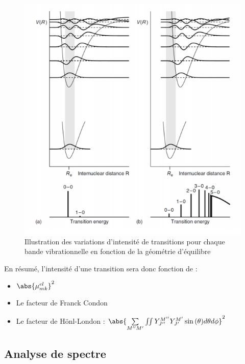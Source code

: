 \begin{figure}
    \centering
    \includegraphics[scale=0.8]{Images3/Recouvrement.PNG}
    \caption{Illustration des variations d'intensité de transitions pour chaque bande vibrationnelle en fonction de la géométrie d'équilibre}
    \label{fig:recouvrement}
\end{figure}
En résumé, l'intensité d'une transition sera donc fonction de  :
\begin{itemize}
    \item $\abs{\mu_{mk}^{el}}^2$\\
    \item Le facteur de Franck Condon\\
    \item Le facteur de Hönl-London : $\abs{\sum\limits_{M''M'}\iint Y_{J''}^{M''}Y_{J'}^{M'}\sin{(\theta)}d\theta d\phi}^2$
\end{itemize}

\subsection{Analyse de spectre}

